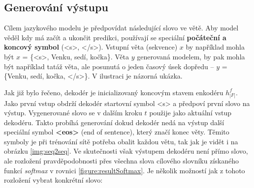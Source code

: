 \subsection{Generování výstupu}

Cílem jazykového modelu je předpovídat následující slovo ve větě. Aby model věděl kdy má začít a ukončit predikci, používají se speciální \textbf{počáteční a koncový symbol} (<s>, </s>). Vstupní věta (sekvence) $x$ by například mohla být $x$ = \{<s>, Venku, sedí, kočka\}. Věta $y$ generovaná modelem, by pak mohla být například tatáž věta, ale posunutá o jeden časový úsek dopředu -- $y$ = \{Venku, sedí, kočka, </s>\}. V ilustraci  je názorná ukázka.

\begin{figure}[h]
    \begin{center}
    \end{center}
	\caption{}
	\label{img:TODO}
\end{figure}


Jak již bylo řečeno, dekodér je inicializovaný koncovým stavem enkodéru $h^{f}_{|F|}$. Jako první vstup obdrží dekodér startovní symbol <s> a předpoví první slovo na výstup. Vygenerované slovo se v dalším kroku $t$ použije jako aktuální vstup dekodéru. Takto probíhá generování dokud dekodér nedá na výstup další speciální symbol \textbf{<eos>} (end of sentence), který značí konec věty. Těmito symboly je při trénování sítě potřeba obalit každou větu, tak jak je vidět i na obrázku \ref{img:seq2seq}. Ve skutečnosti však výstupem dekodéru není přímo slovo, ale rozložení pravděpodobnosti přes všechna slova cílového slovníku získaného funkcí \emph{softmax} v rovnici \ref{figure:resultSoftmax}. Je několik možností jak z tohoto rozložení vybrat konkrétní slovo:

